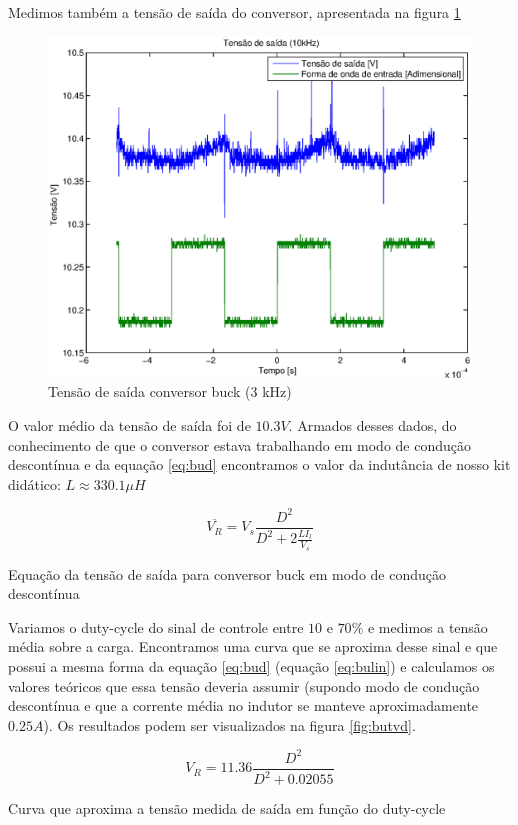 \documentclass{article}
\begin{document}
Medimos também a tensão de saída do conversor, apresentada na figura \ref{fig:but3k}
\begin{figure}[H]
	\centering
	\includegraphics[width=0.5\linewidth]{Dados/buck/t3k}
	\caption{Tensão de saída conversor buck (3 kHz)}
	\label{fig:but3k}
\end{figure}

O valor médio da tensão de saída foi de $10.3 V$. Armados desses dados, do conhecimento de que o conversor estava trabalhando em modo de condução descontínua e da equação \ref{eq:bud} encontramos o valor da indutância de nosso kit didático: $L \approx 330.1 \mu H$

\begin{capequ}
	\begin{equation}
	\overline{V_R} = V_s\frac{D^2}{D^2 + 2\frac{LI_l}{V_s}}
	\end{equation}
	\caption{Equação da tensão de saída para conversor buck em modo de condução descontínua}
	\label{eq:bud}
\end{capequ}

Variamos o duty-cycle do sinal de controle entre $10$ e $70\%$ e medimos a tensão média sobre a carga. Encontramos uma curva que se aproxima desse sinal e que possui a mesma forma da equação \ref{eq:bud} (equação \ref{eq:bulin}) e calculamos os valores teóricos que essa tensão deveria assumir (supondo modo de condução descontínua e que a corrente média no indutor se manteve aproximadamente $0.25 A$). Os resultados podem ser visualizados na figura \ref{fig:butvd}.

\begin{capequ}
	\begin{equation}
	V_R = 11.36\frac{D^2}{D^2 +  0.02055}	
	\end{equation}
	\caption{Curva que aproxima a tensão medida de saída em função do duty-cycle}
	\label{eq:bulin}
\end{capequ}
\end{document}
